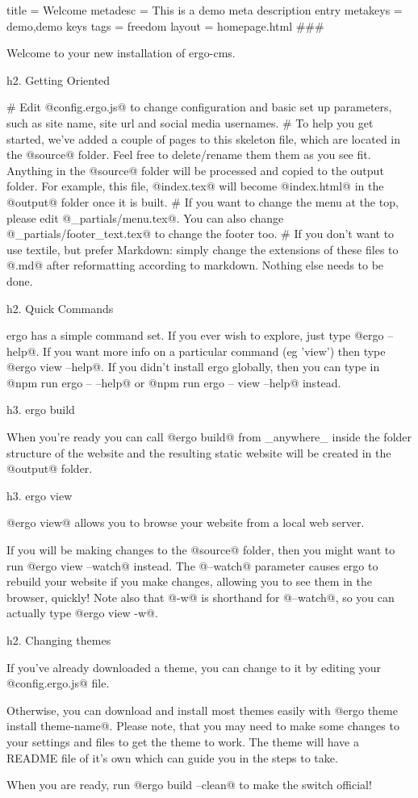 title = Welcome
metadesc = This is a demo meta description entry
metakeys = demo,demo keys
tags = freedom
layout = homepage.html
###

Welcome to your new installation of ergo-cms.


h2. Getting Oriented

# Edit @config.ergo.js@ to change configuration and basic set up parameters, such as site name, site url and social media usernames.
# To help you get started, we've added a couple of pages to this skeleton file, which are located in the @source@ folder. Feel free to delete/rename them them as you see fit. 
Anything in the @source@ folder will be processed and copied to the output folder. For example, this file, @index.tex@ will become @index.html@ in the @output@ folder once it is built.
# If you want to change the menu at the top, please edit @_partials/menu.tex@. You can also change @_partials/footer_text.tex@ to change the footer too.
# If you don't want to use textile, but prefer Markdown: simply change the extensions of these files to @.md@ after reformatting according to markdown. Nothing else needs to be done. 


h2. Quick Commands

ergo has a simple command set. If you ever wish to explore, just type @ergo --help@. If you want more info on a particular command (eg 'view') then type @ergo view --help@. If you didn't install ergo globally, then you can type in @npm run ergo -- --help@ or @npm run ergo -- view --help@ instead.

h3. ergo build

When you're ready you can call @ergo build@ from _anywhere_ inside the folder structure of the website and the resulting static website will be created in the @output@ folder.


h3. ergo view

@ergo view@ allows you to browse your website from a local web server.

If you will be making changes to the @source@ folder, then you might want to run @ergo view --watch@ instead. The @--watch@ parameter causes ergo to rebuild your website if you make changes, allowing you to see them in the browser, quickly! Note also that @-w@ is shorthand for @--watch@, so you can actually type @ergo view -w@.

h2. Changing themes

If you've already downloaded a theme, you can change to it by editing your @config.ergo.js@ file. 

Otherwise, you can download and install most themes easily with @ergo theme install theme-name@. Please note, that you may need to make some changes to your settings and files to get the theme to work. The theme will have a README file of it's own which can guide you in the steps to take. 

When you are ready, run @ergo build --clean@ to make the switch official!
